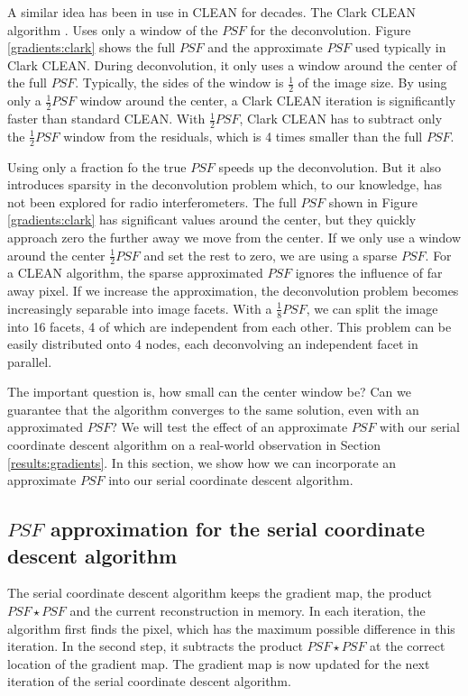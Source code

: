 A similar idea has been in use in CLEAN for decades. The Clark CLEAN algorithm \cite{clark1980efficient}. Uses only a window of the $PSF$ for the deconvolution. Figure \ref{gradients:clark} shows the full $PSF$ and the approximate $PSF$ used typically in Clark CLEAN. During deconvolution, it only uses a window around the center of the full $PSF$. Typically, the sides of the window is $\frac{1}{2}$ of the image size. By using only a $\frac{1}{2} PSF$ window around the center, a Clark CLEAN iteration is significantly faster than standard CLEAN. With $\frac{1}{2} PSF$, Clark CLEAN has to subtract only the $\frac{1}{2} PSF$ window from the residuals, which is 4 times smaller than the full $PSF$.

Using only a fraction fo the true $PSF$ speeds up the deconvolution. But it also introduces sparsity in the deconvolution problem which, to our knowledge, has not been explored for radio interferometers. The full $PSF$ shown in Figure \ref{gradients:clark} has significant values around the center, but they quickly approach zero the further away we move from the center. If we only use a window around the center $\frac{1}{2} PSF$ and set the rest to zero, we are using a sparse $PSF$. For a CLEAN algorithm, the sparse approximated $PSF$ ignores the influence of far away pixel. If we increase the approximation, the deconvolution problem becomes increasingly separable into image facets. With a $\frac{1}{8} PSF$, we can split the image into 16 facets, 4 of which are independent from each other. This problem can be easily distributed onto 4 nodes, each deconvolving an independent facet in parallel.

The important question is, how small can the center window be? Can we guarantee that the algorithm converges to the same solution, even with an approximated $PSF$? We will test the effect of an approximate $PSF$ with our serial coordinate descent algorithm  on a real-world observation in Section \ref{results:gradients}. In this section, we show how we can incorporate an approximate $PSF$ into our serial coordinate descent algorithm.


\subsection{$PSF$ approximation for the serial coordinate descent algorithm}
The serial coordinate descent algorithm keeps the gradient map, the product $PSF \star PSF$ and the current reconstruction in memory. In each iteration, the algorithm first finds the pixel, which has the maximum possible difference in this iteration. In the second step, it subtracts the product $PSF \star PSF$ at the correct location of the gradient map. The gradient map is now updated for the next iteration of the serial coordinate descent algorithm. 

